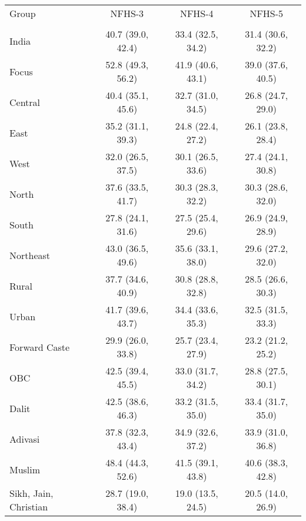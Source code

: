 \begin{tabular}{lccc}
\toprule
Group & NFHS-3 & NFHS-4 & NFHS-5 \\\\
\midrule
India&40.7 (39.0, 42.4)&33.4 (32.5, 34.2)&31.4 (30.6, 32.2)\\
Focus&52.8 (49.3, 56.2)&41.9 (40.6, 43.1)&39.0 (37.6, 40.5)\\
Central&40.4 (35.1, 45.6)&32.7 (31.0, 34.5)&26.8 (24.7, 29.0)\\
East&35.2 (31.1, 39.3)&24.8 (22.4, 27.2)&26.1 (23.8, 28.4)\\
West&32.0 (26.5, 37.5)&30.1 (26.5, 33.6)&27.4 (24.1, 30.8)\\
North&37.6 (33.5, 41.7)&30.3 (28.3, 32.2)&30.3 (28.6, 32.0)\\
South&27.8 (24.1, 31.6)&27.5 (25.4, 29.6)&26.9 (24.9, 28.9)\\
Northeast&43.0 (36.5, 49.6)&35.6 (33.1, 38.0)&29.6 (27.2, 32.0)\\
Rural&37.7 (34.6, 40.9)&30.8 (28.8, 32.8)&28.5 (26.6, 30.3)\\
Urban&41.7 (39.6, 43.7)&34.4 (33.6, 35.3)&32.5 (31.5, 33.3)\\
Forward Caste&29.9 (26.0, 33.8)&25.7 (23.4, 27.9)&23.2 (21.2, 25.2)\\
OBC&42.5 (39.4, 45.5)&33.0 (31.7, 34.2)&28.8 (27.5, 30.1)\\
Dalit&42.5 (38.6, 46.3)&33.2 (31.5, 35.0)&33.4 (31.7, 35.0)\\
Adivasi&37.8 (32.3, 43.4)&34.9 (32.6, 37.2)&33.9 (31.0, 36.8)\\
Muslim&48.4 (44.3, 52.6)&41.5 (39.1, 43.8)&40.6 (38.3, 42.8)\\
Sikh, Jain, Christian&28.7 (19.0, 38.4)&19.0 (13.5, 24.5)&20.5 (14.0, 26.9)\\
\bottomrule
\end{tabular}

